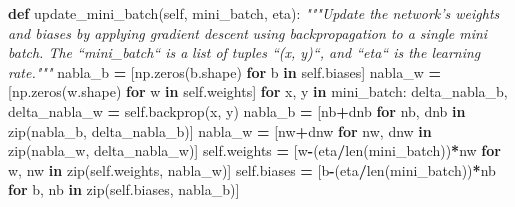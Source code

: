 \documentclass[]{book}
\newenvironment{Shaded}{\begin{snugshade}}{\end{snugshade}}
\newcommand{\KeywordTok}[1]{\textcolor[rgb]{0.13,0.29,0.53}{\textbf{{#1}}}}
\newcommand{\CommentTok}[1]{\textcolor[rgb]{0.56,0.35,0.01}{\textit{{#1}}}}
\newcommand{\VariableTok}[1]{\textcolor[rgb]{0.00,0.00,0.00}{{#1}}}
\newcommand{\ControlFlowTok}[1]{\textcolor[rgb]{0.13,0.29,0.53}{\textbf{{#1}}}}
\newcommand{\OperatorTok}[1]{\textcolor[rgb]{0.81,0.36,0.00}{\textbf{{#1}}}}
\newcommand{\BuiltInTok}[1]{{#1}}
\newcommand{\NormalTok}[1]{{#1}}
\begin{document}
\begin{Shaded}
\begin{Highlighting}[]
    \KeywordTok{def} \NormalTok{update_mini_batch(}\VariableTok{self}\NormalTok{, mini_batch, eta):}
        \CommentTok{"""Update the network's weights and biases by applying gradient descent }
\CommentTok{        using backpropagation to a single mini batch.  The ``mini_batch`` is a }
\CommentTok{        list of tuples ``(x, y)``, and ``eta`` is the learning rate."""}
        \NormalTok{nabla_b }\OperatorTok{=} \NormalTok{[np.zeros(b.shape) }\ControlFlowTok{for} \NormalTok{b }\OperatorTok{in} \VariableTok{self}\NormalTok{.biases]}
        \NormalTok{nabla_w }\OperatorTok{=} \NormalTok{[np.zeros(w.shape) }\ControlFlowTok{for} \NormalTok{w }\OperatorTok{in} \VariableTok{self}\NormalTok{.weights]}
        \ControlFlowTok{for} \NormalTok{x, y }\OperatorTok{in} \NormalTok{mini_batch:}
            \NormalTok{delta_nabla_b, delta_nabla_w }\OperatorTok{=} \VariableTok{self}\NormalTok{.backprop(x, y)}
            \NormalTok{nabla_b }\OperatorTok{=} \NormalTok{[nb}\OperatorTok{+}\NormalTok{dnb }\ControlFlowTok{for} \NormalTok{nb, dnb }\OperatorTok{in} \BuiltInTok{zip}\NormalTok{(nabla_b, delta_nabla_b)]}
            \NormalTok{nabla_w }\OperatorTok{=} \NormalTok{[nw}\OperatorTok{+}\NormalTok{dnw }\ControlFlowTok{for} \NormalTok{nw, dnw }\OperatorTok{in} \BuiltInTok{zip}\NormalTok{(nabla_w, delta_nabla_w)]}
        \VariableTok{self}\NormalTok{.weights }\OperatorTok{=} \NormalTok{[w}\OperatorTok{-}\NormalTok{(eta}\OperatorTok{/}\BuiltInTok{len}\NormalTok{(mini_batch))}\OperatorTok{*}\NormalTok{nw}
                        \ControlFlowTok{for} \NormalTok{w, nw }\OperatorTok{in} \BuiltInTok{zip}\NormalTok{(}\VariableTok{self}\NormalTok{.weights, nabla_w)]}
        \VariableTok{self}\NormalTok{.biases }\OperatorTok{=} \NormalTok{[b}\OperatorTok{-}\NormalTok{(eta}\OperatorTok{/}\BuiltInTok{len}\NormalTok{(mini_batch))}\OperatorTok{*}\NormalTok{nb}
                       \ControlFlowTok{for} \NormalTok{b, nb }\OperatorTok{in} \BuiltInTok{zip}\NormalTok{(}\VariableTok{self}\NormalTok{.biases, nabla_b)]}


\end{Highlighting}
\end{Shaded}
\end{document}
